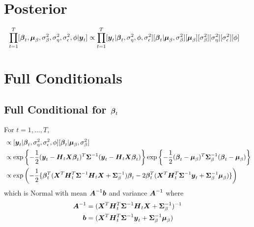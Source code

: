 \documentclass[fleqn]{article}
\def\bm#1{\mbox{\boldmath $#1$}}
\begin{document}
\section{Posterior}
%
\begin{align*}
\prod_{t = 1}^T [\bm{\beta}_t, \bm{\mu}_\beta, \sigma^2_\beta, \sigma^2_\eta, \sigma^2_\epsilon, \phi | \bm{y}_t] & \propto \prod_{t = 1}^T [\bm{y}_t | \bm{\beta}_t, \sigma^2_\eta, \phi, \sigma^2_\epsilon] [\bm{\beta}_t | \bm{\mu}_\beta, \sigma^2_\beta] [\bm{\mu}_\beta] [\sigma^2_\beta] [\sigma^2_\eta] [\sigma^2_\epsilon] [\phi]
\end{align*}
%
\section{Full Conditionals}
%
\subsection{Full Conditional for $\bm{\beta}_t$}
%
For $t = 1, \ldots, T$,
\begin{align*}
[\bm{\beta}_t | \cdot] & \propto [\bm{y}_t | \bm{\beta}_t, \sigma^2_\eta, \sigma^2_\epsilon, \phi] [\bm{\beta}_t | \bm{\mu}_\beta, \sigma^2_\beta]\\
%
& \propto \exp{ \left\{ - \frac{1} {2} (\bm{y}_t - \bm{H}_t \bm{X} \bm{\beta}_t)^T \bm{\Sigma}^{ - 1} (\bm{y}_t - \bm{H}_t \bm{X} \bm{\beta}_t) \right\} } \exp{ \left\{ - \frac{1} {2} (\bm{\beta}_t - \bm{\mu}_\beta)^T \bm{\Sigma}_\beta^{ - 1} (\bm{\beta}_t - \bm{\mu}_\beta) \right\}}\\
%
& \propto \exp{\left( - \frac{1} {2} \{\bm{\beta}_t^T (\bm{X}^T \bm{H}_t^T \bm{\Sigma}^{ - 1} \bm{H}_t \bm{X} + \bm{\Sigma}_\beta^{ - 1}) \bm{\beta}_t - 2 \bm{\beta}_t^T (\bm{X}^T \bm{H}_t^T \bm{\Sigma}^{ - 1} \bm{y}_t + \bm{\Sigma}_\beta^{ - 1} \bm{\mu}_\beta) \} \right) }
\end{align*}
%
which is Normal with mean $ \bm{A}^{ - 1} \bm{b}$ and variance $\bm{A}^{ - 1}$ where
\begin{align*}
  \bm{A}^{ - 1} & = (\bm{X}^T \bm{H}_t^T \bm{\Sigma}^{ - 1} \bm{H}_t \bm{X} + \bm{\Sigma}_\beta^{ - 1})^{ - 1}\\
  \bm{b} & = (\bm{X}^T \bm{H}_t^T \bm{\Sigma}^{ - 1} \bm{y}_t + \bm{\Sigma}_\beta^{ - 1} \bm{\mu}_\beta)\\
\end{align*}
%
\end{document}
